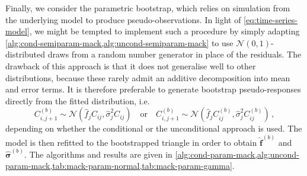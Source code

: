 \documentclass[a4paper]{book}
\begin{document}
Finally, we consider the parametric bootstrap, which relies on simulation from the underlying model to produce pseudo-observations. In light of \cref{eq:time-series-model}, we might be tempted to implement such a procedure by simply adapting \cref{alg:cond-semiparam-mack,alg:uncond-semiparam-mack} to use $\mathcal{N}(0, 1)$-distributed draws from a random number generator in place of the residuals. The drawback of this approach is that it does not generalise well to other distributions, because these rarely admit an additive decomposition into mean and error terms. It is therefore preferable to generate bootstrap pseudo-responses directly from the fitted distribution, i.e.\
\begin{equation}
  C^{(b)}_{i, j + 1} \sim \mathcal{N}(\widehat{f}_j C_{ij}, \widehat{\sigma}^2_j C_{ij}) \quad \text{or} \quad C^{(b)}_{i, j + 1} \sim \mathcal{N}(\widehat{f}_j C^{(b)}_{ij}, \widehat{\sigma}^2_j C^{(b)}_{ij}) \,,
\end{equation}
depending on whether the conditional or the unconditional approach is used. The model is then refitted to the bootstrapped triangle in order to obtain $\widehat{\bm{f}}^{(b)}$ and $\widehat{\bm{\sigma}}^{(b)}$. The algorithms and results are given in \cref{alg:cond-param-mack,alg:uncond-param-mack,tab:mack-param-normal,tab:mack-param-gamma}.
\end{document}
